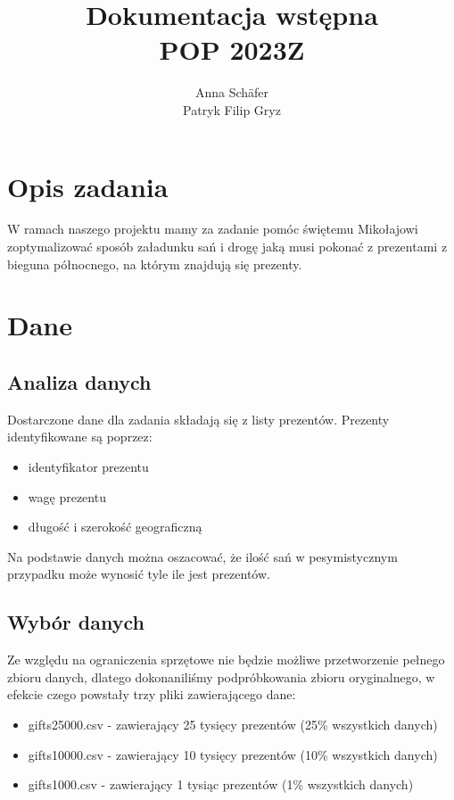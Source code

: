 \documentclass[titlepage]{article}
\title{
    {
        \huge Dokumentacja wstępna
    } \\
    POP 2023Z
}
\author {
    Anna Schäfer  \\
    Patryk Filip Gryz
}
\begin{document}
    \maketitle

    \newpage

    \tableofcontents

    \newpage

    \section{
        Opis zadania
    }
    W ramach naszego projektu mamy za zadanie pomóc świętemu Mikołajowi zoptymalizować sposób załadunku sań i 
    drogę jaką musi pokonać z prezentami z bieguna północnego, na którym znajdują się prezenty.

    \section{
        Dane
    }
        \subsection{
            Analiza danych
        }
            Dostarczone dane dla zadania składają się z listy prezentów. Prezenty identyfikowane są poprzez:
            \begin{itemize}
                \item identyfikator prezentu
                \item wagę prezentu
                \item długość i szerokość geograficzną
            \end{itemize}    

            Na podstawie danych można oszacować, że ilość sań w pesymistycznym przypadku może wynosić tyle ile jest prezentów.

        \subsection{
            Wybór danych
        }
            Ze względu na ograniczenia sprzętowe nie będzie możliwe przetworzenie pełnego zbioru danych, 
            dlatego dokonaniliśmy podpróbkowania zbioru oryginalnego, w efekcie czego powstały trzy pliki zawierającego dane:
            \begin{itemize}
                \item gifts25000.csv - zawierający 25 tysięcy prezentów (25\% wszystkich danych)
                \item gifts10000.csv - zawierający 10 tysięcy prezentów (10\% wszystkich danych)
                \item gifts1000.csv - zawierający 1 tysiąc prezentów (1\% wszystkich danych)
            \end{itemize} 
\end{document}
